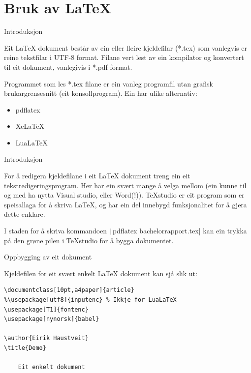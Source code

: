 \section{Bruk av \LaTeX}

\begin{frame}{Introduksjon}
	
	Eit \LaTeX{} dokument består av ein eller fleire kjeldefilar (*.tex) som vanlegvis er reine tekstfilar i UTF-8 format. Filane vert lest av ein kompilator og konvertert til eit dokument, vanlegivis i *.pdf format.
	
	Programmet som les *.tex filane er ein vanleg programfil utan grafisk brukargrensesnitt (eit konsollprogram). Ein har ulike alternativ:
	
	\begin{itemize}
		\item pdflatex
		\item XeLaTeX
		\item LuaLaTeX
	\end{itemize}
	
\end{frame}


\begin{frame}{Introduksjon}
	
	For å redigera kjeldefilane i eit \LaTeX{} dokument treng ein eit tekstredigeringsprogram. Her har ein svært mange å velga mellom (ein kunne til og med ha nytta Visual studio, eller Word(!)). TeXstudio er eit program som er speisallaga for å skriva \LaTeX{}, og har ein del innebygd funksjonalitet for å gjera dette enklare.
	
	I staden for å skriva kommandoen \texttt|pdflatex bachelorrapport.tex| kan ein trykka på den grøne pilen i TeXstudio for å bygga dokumentet.
	
\end{frame}

\begin{frame}[containsverbatim]{Oppbygging av eit dokument}
	
Kjeldefilen for eit svært enkelt \LaTeX{} dokument kan sjå slik ut:

	\begin{verbatim}
\documentclass[10pt,a4paper]{article}
%\usepackage[utf8]{inputenc} % Ikkje for LuaLaTeX
\usepackage[T1]{fontenc}
\usepackage[nynorsk]{babel}

\author{Eirik Haustveit}
\title{Demo}

	Eit enkelt dokument

	\end{verbatim}
	
\end{frame}


